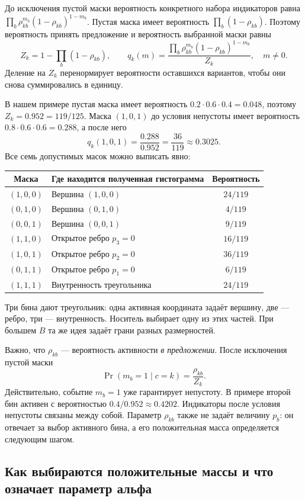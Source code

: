 \documentclass[11pt,a4paper]{article}
\begin{document}
До исключения пустой маски вероятность конкретного набора индикаторов равна
$\prod_b\rho_{kb}^{m_b}(1-\rho_{kb})^{1-m_b}$.
Пустая маска имеет вероятность $\prod_b(1-\rho_{kb})$.
Поэтому вероятность принять предложение и вероятность выбранной маски равны
\[
 Z_k=1-\prod_b(1-\rho_{kb}),\qquad
 q_k(m)=\frac{\prod_b\rho_{kb}^{m_b}(1-\rho_{kb})^{1-m_b}}{Z_k},
 \quad m\ne0.
\]
Деление на $Z_k$ перенормирует вероятности оставшихся вариантов,
чтобы они снова суммировались в единицу.

В нашем примере пустая маска имеет вероятность
$0.2\cdot0.6\cdot0.4=0.048$, поэтому $Z_k=0.952=119/125$.
Маска $(1,0,1)$ до условия непустоты имеет вероятность
$0.8\cdot0.6\cdot0.6=0.288$, а после него
\[
 q_k(1,0,1)=\frac{0.288}{0.952}=\frac{36}{119}\approx0.3025.
\]
Все семь допустимых масок можно выписать явно:
\begin{center}
\begin{tabular}{clc}
\toprule
Маска & Где находится полученная гистограмма & Вероятность\\
\midrule
$(1,0,0)$ & Вершина $(1,0,0)$ & $24/119$\\
$(0,1,0)$ & Вершина $(0,1,0)$ & $4/119$\\
$(0,0,1)$ & Вершина $(0,0,1)$ & $9/119$\\
$(1,1,0)$ & Открытое ребро $p_3=0$ & $16/119$\\
$(1,0,1)$ & Открытое ребро $p_2=0$ & $36/119$\\
$(0,1,1)$ & Открытое ребро $p_1=0$ & $6/119$\\
$(1,1,1)$ & Внутренность треугольника & $24/119$\\
\bottomrule
\end{tabular}
\end{center}
Три бина дают треугольник: одна активная координата задаёт вершину,
две --- ребро, три --- внутренность. Носитель выбирает одну из этих частей.
При большем $B$ та же идея задаёт грани разных размерностей.

Важно, что $\rho_{kb}$ --- вероятность активности \emph{в предложении}.
После исключения пустой маски
\[
 \Pr(m_b=1\mid c=k)=\frac{\rho_{kb}}{Z_k}.
\]
Действительно, событие $m_b=1$ уже гарантирует непустоту.
В примере второй бин активен с вероятностью $0.4/0.952\approx0.4202$.
Индикаторы после условия непустоты связаны между собой.
Параметр $\rho_{kb}$ также не задаёт величину $p_b$: он отвечает за
выбор активного бина, а его положительная масса определяется следующим шагом.

\subsection{Как выбираются положительные массы и что означает параметр альфа}
\end{document}
